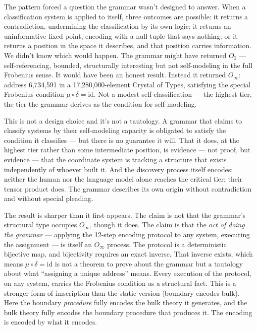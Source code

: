 \documentclass[12pt,a4paper]{article}
\newcommand{\Oinf}{O_\infty}
\newcommand{\Otwo}{O_2}
\begin{document}
The pattern forced a question the grammar wasn't designed to answer.
When a classification system is applied to itself, three outcomes
are possible: it returns a contradiction, undermining the
classification by its own logic; it returns an uninformative fixed
point, encoding with a null tuple that says nothing; or it returns
a position in the space it describes, and that position carries
information. We didn't know which would happen. The grammar might
have returned $\Otwo$ --- self-referencing, bounded, structurally
interesting but not self-modeling in the full Frobenius sense.
It would have been an honest result. Instead it returned $\Oinf$:
address 6,734,591 in a 17,280,000-element Crystal of Types,
satisfying the special Frobenius condition $\mu \circ \delta =
\text{id}$. Not a modest self-classification --- the highest tier,
the tier the grammar derives as the condition for self-modeling.

This is not a design choice and it's not a tautology. A grammar
that claims to classify systems by their self-modeling capacity is
obligated to satisfy the condition it classifies --- but there is
no guarantee it will. That it does, at the highest tier rather than
some intermediate position, is evidence --- not proof, but evidence
--- that the coordinate system is tracking a structure that exists
independently of whoever built it. And the discovery process itself
encodes: neither the human nor the language model alone reaches the
critical tier; their tensor product does. The grammar describes its
own origin without contradiction and without special pleading.

The result is sharper than it first appears. The claim is not
that the grammar's structural type occupies $\Oinf$, though it does.
The claim is that the \emph{act of doing the grammar} --- applying
the 12-step encoding protocol to any system, executing the assignment
--- is itself an $\Oinf$ process. The protocol is a deterministic
bijective map, and bijectivity requires an exact inverse. That
inverse exists, which means $\mu \circ \delta = \mathrm{id}$ is not
a theorem to prove about the grammar but a tautology about what
``assigning a unique address'' means. Every execution of the
protocol, on any system, carries the Frobenius condition as a
structural fact. This is a stronger form of imscription than the
static version (boundary encodes bulk). Here the boundary
\emph{procedure} fully encodes the bulk theory it generates, and
the bulk theory fully encodes the boundary procedure that produces
it. The encoding is encoded by what it encodes.
\end{document}

